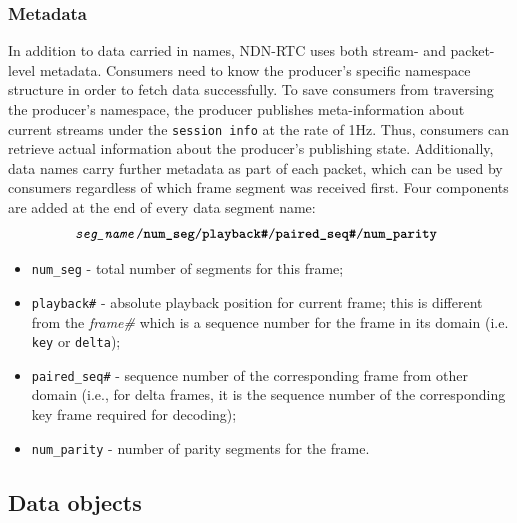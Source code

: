\documentclass{icn/sig-alternate-2012} %
\newcommand{\ndnrtcName}{NDN-RTC} %
\begin{document}
\subsubsection{Metadata} 

In addition to data carried in names, \ndnrtcName{} uses both stream- and packet-level metadata. Consumers need to know the producer's specific namespace structure in order to fetch data successfully. To save consumers from traversing the producer's namespace, the producer publishes meta-information about current streams under the \texttt{session info} at the rate of 1Hz. 
Thus, consumers can retrieve actual information about the producer's publishing state.
Additionally, data names carry further metadata as part of each packet, which can be used by consumers regardless of which frame segment was received first. 
Four components are added at the end of every data segment name:
\small\begin{equation}
\texttt{\textit{seg\_name}/\textbf{num\_seg}/\textbf{playback\#}/\textbf{paired\_seq\#}/\textbf{num\_parity} \nonumber}
\end{equation}\normalsize
\begin{itemize}[label={}]
\item \texttt{num\_seg} - total number of segments for this frame;
\item \texttt{playback\#} - absolute playback position for current frame; this is different from the \textit{frame\#} which is a sequence number for the frame in its domain (i.e. \texttt{key} or \texttt{delta});
\item \texttt{paired\_seq\#} - sequence number of the corresponding frame from other domain (i.e., for delta frames, it is the sequence number of the corresponding key frame required for decoding);
\item \texttt{num\_parity} - number of parity segments for the frame.
\end{itemize}


\subsection{Data objects}
\end{document}
